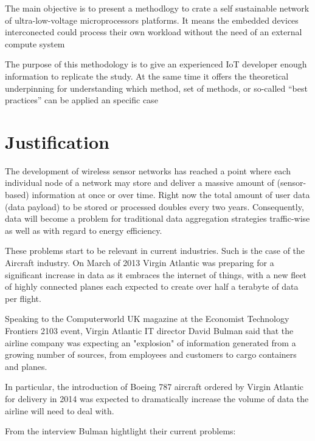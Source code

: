 The main objective is to present a methodlogy to crate a self sustainable
network of ultra-low-voltage microprocessors platforms. It means the embedded 
devices interconected could process their own workload without the need of an 
external compute system

The purpose of this methodology is to give an experienced IoT  developer 
enough information to replicate the study. At the same time it offers the theoretical 
underpinning for understanding which method, set of methods, or so-called “best 
practices” can be applied an specific case


\section{Justification}
\noindent

The development of wireless sensor networks has reached a point where each 
individual node of a network may store and deliver a massive amount of 
(sensor-based) information at once or over time. Right now the total amount of 
user data (data payload) to be stored or processed doubles every two years. Consequently,
data will become a problem for traditional data aggregation strategies 
traffic-wise as well as with regard to energy efficiency. 

These problems start to be relevant in current industries. Such is the case of 
the Aircraft industry. On March of 2013 Virgin Atlantic was preparing for a 
significant increase in data as it embraces the internet of things, with a new fleet of highly 
connected planes each expected to create over half a terabyte of data per flight.

Speaking to the Computerworld UK magazine at the Economist Technology Frontiers 2103 event, Virgin 
Atlantic IT director David Bulman said that the airline company was expecting an 
"explosion" of information generated from a growing number of sources, from 
employees and customers to cargo containers and planes.

In particular, the introduction of Boeing 787 aircraft ordered by Virgin 
Atlantic for delivery in 2014  was expected to dramatically increase the volume 
of data the airline will need to deal with.

From the interview Bulman hightlight their current problems: 


